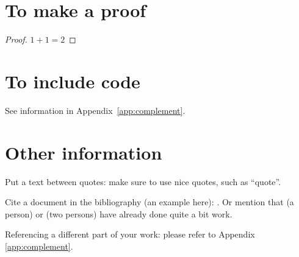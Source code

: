 \section{To make a proof}
\begin{proof}
  $1 + 1 = 2$
\end{proof}

\section{To include \Rp code}
See information in Appendix~\ref{app:complement}.


\section{Other information}
Put a text between quotes: make sure to use nice quotes, such as ``quote''.

Cite a document in the bibliography (an example here): \cite{Reference}.
Or mention that \citeauthor{HamF85} (a person) or \citeauthor{StaWW91} (two
persons) have already done quite a bit work.

Referencing a different part of your work: please refer to Appendix \ref{app:complement}.

